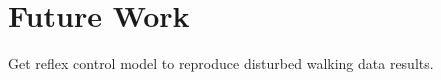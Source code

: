 \chapter{Future Work}\label{sec:future_work}

Get reflex control model to reproduce disturbed walking data results.
